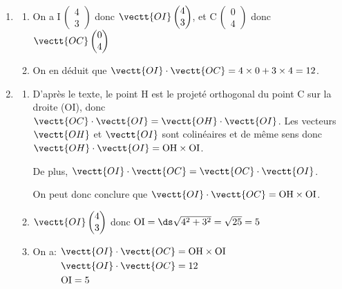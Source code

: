 \begin{enumerate}
\item 
	\begin{enumerate}
		\item %
On a I\,$\begin{pmatrix} 4\\3 \end{pmatrix}$ donc
$\vectt{OI} \begin{pmatrix} 4\\3 \end{pmatrix}$,
et
C\,$\begin{pmatrix} 0\\4 \end{pmatrix}$ donc
$\vectt{OC} \begin{pmatrix} 0\\4 \end{pmatrix}$

		\item %
On en déduit que
$\vectt{OI}\cdot \vectt{OC}=4\times 0 + 3\times 4 = 12$.		
	\end{enumerate}
	
\item 
	\begin{enumerate}
		\item %
D'après le texte, le point H est le projeté orthogonal du point C sur la droite (OI), donc
$\vectt{OC}\cdot \vectt{OI} = \vectt{OH}\cdot \vectt{OI}$.
Les vecteurs $ \vectt{OH}$ et $\vectt{OI}$ sont colinéaires et de même sens donc $\vectt{OH}\cdot \vectt{OI}= \text{OH}\times \text{OI}$.

De plus, $\vectt{OI}\cdot \vectt{OC} = \vectt{OC}\cdot \vectt{OI}$.

On peut donc conclure que $\vectt{OI}\cdot \vectt{OC} = \text{OH}\times \text{OI}$.

		\item %
$\vectt{OI} \begin{pmatrix} 4\\3 \end{pmatrix}$ donc $\text{OI} = \ds\sqrt{4^2+3^2} = \sqrt{25} = 5$

		\item %
On a: $\aligned[t]
 & \vectt{OI}\cdot \vectt{OC} = \text{OH}\times \text{OI}\\
& \vectt{OI}\cdot \vectt{OC} = 12\\
& \text{OI}=5
\endaligned$


\end{enumerate}
\end{enumerate}

